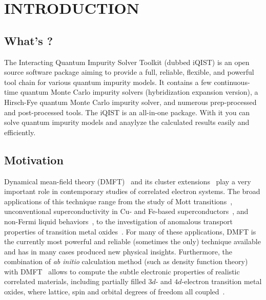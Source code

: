 \chapter{INTRODUCTION}
\section{What's {\iqist}?}

The Interacting Quantum Impurity Solver Toolkit (dubbed iQIST) is an open source software package aiming to provide a full, reliable, flexible, and powerful tool chain for various quantum impurity models. It contains a few continuous-time quantum Monte Carlo impurity solvers (hybridization expansion version), a Hirsch-Fye quantum Monte Carlo impurity solver, and numerous prep-processed and post-processed tools. The iQIST is an all-in-one package. With it you can solve quantum impurity models and anaylyze the calculated results easily and efficiently.

\section{Motivation}

Dynamical mean-field theory (DMFT)~\cite{RevModPhys.68.13} and its cluster extensions~\cite{RevModPhys.77.1027,RevModPhys.78.865} play a very important role in contemporary studies of correlated electron systems. The broad applications of this technique range from the study of Mott transitions~\cite{PhysRevB.54.8452,PhysRevLett.101.186403}, unconventional superconductivity in Cu- and Fe-based superconductors~\cite{PhysRevLett.96.047005,Yin2011,PhysRevLett.106.047004,Wang13,PhysRevLett.110.216405,PhysRevB.88.245110}, and non-Fermi liquid behaviors~\cite{PhysRevLett.102.206407,PhysRevLett.108.216401,PhysRevLett.110.086401}, to the investigation of anomalous transport properties of transition metal oxides~\cite{RevModPhys.70.1039}. For many of these applications, DMFT is the currently most powerful and reliable (sometimes the only) technique available and has in many cases produced new physical insights. Furthermore, the combination of \emph{ab initio} calculation method (such as density function theory) with DMFT~\cite{RevModPhys.78.865} allows to compute the subtle electronic properties of realistic correlated materials, including partially filled $3d$- and $4d$-electron transition metal oxides, where lattice, spin and orbital degrees of freedom all coupled~\cite{RevModPhys.70.1039}.

